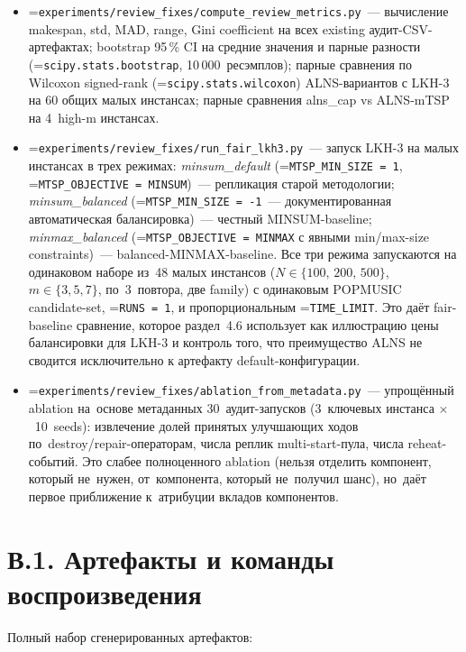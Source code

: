 \documentclass[a4paper,14pt]{extreport}
\makeatletter
\let\old@texttt\texttt
\renewcommand{\texttt}[1]{{\sloppy\hyphenchar\font=\m@ne\old@texttt{#1}}}
\makeatother
\begin{document}
\begin{itemize}
\item \texttt{experiments/review\_fixes/compute\_review\_metrics.py}~--- вычисление makespan, std, MAD, range, Gini coefficient на всех existing аудит-CSV-артефактах; bootstrap 95\,\% CI на средние значения и парные разности (\texttt{scipy.stats.bootstrap}, 10\,000~ресэмплов); парные сравнения по Wilcoxon signed-rank (\texttt{scipy.stats.wilcoxon}) ALNS-вариантов с LKH-3 на 60 общих малых инстансах; парные сравнения alns\_cap vs ALNS-mTSP на 4~high-m инстансах.

\item \texttt{experiments/review\_fixes/run\_fair\_lkh3.py}~--- запуск LKH-3 на малых инстансах в трех режимах: \emph{minsum\_default} (\texttt{MTSP\_MIN\_SIZE = 1}, \texttt{MTSP\_OBJECTIVE = MINSUM})~--- репликация старой методологии; \emph{minsum\_balanced} (\texttt{MTSP\_MIN\_SIZE = -1}~--- документированная автоматическая балансировка)~--- честный MINSUM-baseline; \emph{minmax\_balanced} (\texttt{MTSP\_OBJECTIVE = MINMAX} с явными min/max-size constraints)~--- balanced-MINMAX-baseline. Все три режима запускаются на одинаковом наборе из~48 малых инстансов ($N \in \{100,\,200,\,500\}$, $m \in \{3,5,7\}$, по~3~повтора, две family) с одинаковым POPMUSIC candidate-set, \texttt{RUNS = 1}, и пропорциональным \texttt{TIME\_LIMIT}. Это даёт fair-baseline сравнение, которое раздел~4.6 использует как иллюстрацию цены балансировки для LKH-3 и контроль того, что преимущество ALNS не сводится исключительно к артефакту default-конфигурации.

\item \texttt{experiments/review\_fixes/ablation\_from\_metadata.py}~--- упрощённый ablation на~основе метаданных 30~аудит-запусков (3~ключевых инстанса $\times$~10~seeds): извлечение долей принятых улучшающих ходов по~destroy/repair-операторам, числа реплик multi-start-пула, числа reheat-событий. Это слабее полноценного ablation (нельзя отделить компонент, который не~нужен, от~компонента, который не~получил шанс), но~даёт первое приближение к~атрибуции вкладов компонентов.
\end{itemize}

\section*{В.1. Артефакты и команды воспроизведения}

Полный набор сгенерированных артефактов:
\end{document}
